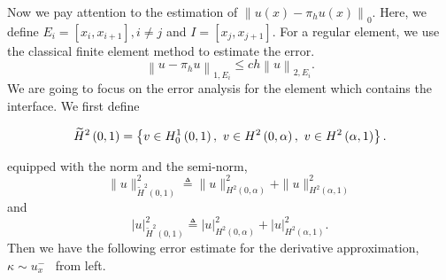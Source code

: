 \documentclass[11pt]{article}
\numberwithin{equation}{section}
\begin{document}
Now we pay attention to the estimation of $\left\|u\left(x\right)-\pi_{h} u\left(x\right)\right\|_{0}$.
Here, we define $E_{i}=\left[x_{i}, x_{i+1}\right], i\neq j$ and $I=\left[x_{j}, x_{j+1}\right]$.
For a regular element, we use the classical finite element method to  estimate  the error.
\begin{equation}\label{pp ch2}
\left\|u-\pi_{h} u\right\|_{1, E_{i}}\leq ch\left\|u\right\|_{2, E_{i}}.
\end{equation}
We are going  to focus on the error analysis for the element which contains the interface.
We first define
\begin{small}
\begin{equation*}
\widetilde{H}^{2}\left(0, 1\right)=\left\{v\in H^{1}_{0}\left(0, 1\right),\\
~v\in H^{2}\left(0, \alpha\right),~v\in H^{2}\left(\alpha, 1\right)\right\}.
\end{equation*}
\end{small}
equipped with the norm and the semi-norm,
\begin{equation*}
\|u\|^{2}_{\widetilde{H}^{2}\left(0, 1\right)} \triangleq  \|u\|^{2}_{H^{2}\left(0, \alpha\right)}+\|u\|^{2}_{H^{2}\left(\alpha, 1\right)} \end{equation*}
and
\begin{equation*}
|u|^{2}_{\widetilde{H}^{2}\left(0, 1\right)} \triangleq |u|^{2}_{H^{2}\left(0, \alpha\right)}+|u|^{2}_{H^{2}\left(\alpha, 1\right)}.
\end{equation*}
Then we have the following error estimate for the derivative approximation, $\kappa\sim u_x^-$ \ from left.
\end{document}

